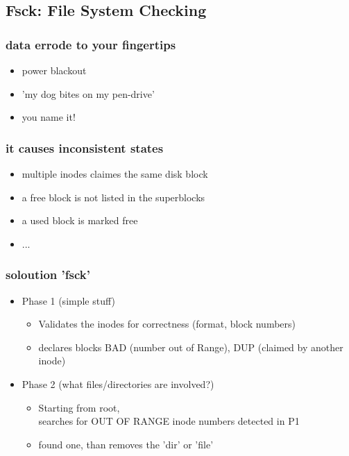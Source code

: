 \documentclass[draft,handout]{beamer}
\begin{document}
    \subsection{Fsck: File System Checking}
	    \begin{frame}
			\frametitle{data errode to your fingertips}
			\begin{itemize}
                \item<1-> power blackout
                \item<1-> 'my dog bites on my pen-drive'
                \item<1-> you name it!
            \end{itemize}
        \end{frame}
        \begin{frame}
			\frametitle{it causes inconsistent states}
            \begin{itemize}
                \item<1-> multiple inodes claimes the same disk block
                \item<1-> a free block is not listed in the superblocks
                \item<1-> a used block is marked free
                \item<1-> ...
            \end{itemize}
		\end{frame}
        \begin{frame}
			\frametitle{soloution 'fsck'}
            \begin{itemize}
                \item<1-> Phase 1 (simple stuff)
                \begin{itemize}
                    \item<1-> Validates the inodes for correctness (format, block numbers)
                    \item<1-> declares blocks BAD (number out of Range), DUP (claimed by another inode)
                \end{itemize}
                \item<2-> Phase 2 (what files/directories are involved?)
                \begin{itemize}
                    \item<2-> Starting from root, \\
                              searches for OUT OF RANGE inode numbers detected in P1
                    \item<2-> found one, than removes the 'dir' or 'file'
                \end{itemize}
            \end{itemize}
        \end{frame}
\end{document}
